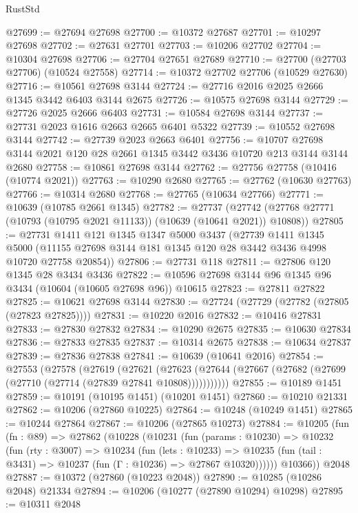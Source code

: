 \begin{lexlean}{RustStd}
\begin{coremodule}
@27699 := @27694 @27698
@27700 := @10372 @27687
@27701 := @10297 @27698
@27702 := @27631 @27701
@27703 := @10206 @27702
@27704 := @10304 @27698
@27706 := @27704 @27651 @27689
@27710 := @27700 (@27703 @27706) (@10524 @27558)
@27714 := @10372 @27702 @27706 (@10529 @27630)
@27716 := @10561 @27698 @3144
@27724 := @27716 @2016 @2025 @2666 @1345 @3442 @6403 @3144 @2675
@27726 := @10575 @27698 @3144
@27729 := @27726 @2025 @2666 @6403
@27731 := @10584 @27698 @3144
@27737 := @27731 @2023 @1616 @2663 @2665 @6401 @5322
@27739 := @10552 @27698 @3144
@27742 := @27739 @2023 @2663 @6401
@27756 := @10707 @27698 @3144 @2021 @120 @28 @2661 @1345 @3442 @3436 @10720 @213 @3144 @3144 @2680
@27758 := @10861 @27698 @3144
@27762 := @27756 @27758 (@10416 (@10774 @2021))
@27763 := @10290 @2680
@27765 := @27762 (@10630 @27763)
@27766 := @10314 @2680
@27768 := @27765 (@10634 @27766)
@27771 := @10639 (@10785 @2661 @1345)
@27782 := @27737
    (@27742 (@27768 @27771 (@10793 (@10795 @2021 @11133)) (@10639 (@10641 @2021)) @10808))
@27805 := @27731
    @1411
    @121
    @1345
    @1347
    @5000
    @3437
    (@27739
      @1411
      @1345
      @5000
      (@11155 @27698 @3144 @181 @1345 @120 @28 @3442 @3436 @4998 @10720 @27758 @20854))
@27806 := @27731 @118
@27811 := @27806 @120 @1345 @28 @3434 @3436
@27822 := @10596 @27698 @3144 @96 @1345 @96 @3434 (@10604 (@10605 @27698 @96)) @10615
@27823 := @27811 @27822
@27825 := @10621 @27698 @3144
@27830 := @27724 (@27729 (@27782 (@27805 (@27823 @27825))))
@27831 := @10220 @2016
@27832 := @10416 @27831
@27833 := @27830 @27832
@27834 := @10290 @2675
@27835 := @10630 @27834
@27836 := @27833 @27835
@27837 := @10314 @2675
@27838 := @10634 @27837
@27839 := @27836 @27838
@27841 := @10639 (@10641 @2016)
@27854 := @27553
    (@27578
      (@27619
        (@27621
          (@27623 (@27644 (@27667 (@27682 (@27699 (@27710 (@27714 (@27839 @27841 @10808)))))))))))
@27855 := @10189 @1451
@27859 := @10191 (@10195 @1451) (@10201 @1451)
@27860 := @10210 @21331
@27862 := @10206 (@27860 @10225)
@27864 := @10248 (@10249 @1451)
@27865 := @10244 @27864
@27867 := @10206 (@27865 @10273)
@27884 := @10205
    (fun (fn : @89) =>
    @27862
      (@10228
        (@10231
          (fun (params : @10230) =>
          @10232
            (fun (rty : @3007) =>
            @10234
              (fun (lets : @10233) =>
              @10235 (fun (tail : @3431) => @10237 (fun (Γ : @10236) => @27867 @10320))))))
        @10366))
    @2048
@27887 := @10372 (@27860 (@10223 @2048))
@27890 := @10285 (@10286 @2048) @21334
@27894 := @10206 (@10277 (@27890 @10294) @10298)
@27895 := @10311 @2048

\end{coremodule}
\end{lexlean}
